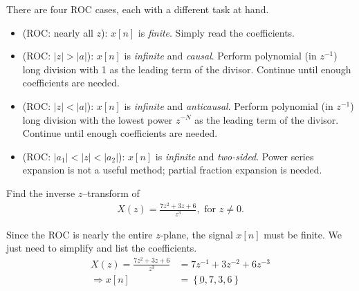 \documentclass{report}
\begin{document}
\begin{tcolorbox}[width=\textwidth,colback={white}, sharp corners]
    There are four ROC cases, each with a different task at hand.
    \begin{itemize}
        \item (ROC: nearly all $z$): $x[n]$ is \emph{finite}. Simply read the coefficients.
        \item (ROC: $|z|>|a|$): $x[n]$ is \emph{infinite} and \emph{causal}. Perform polynomial (in $z^{-1}$) long division with 1 as the leading term of the divisor. Continue until enough coefficients are needed.
        \item (ROC: $|z|<|a|$): $x[n]$ is \emph{infinite} and \emph{anticausal}. Perform polynomial (in $z^{-1}$) long division with the lowest power $z^{-N}$ as the leading term of the divisor. Continue until enough coefficients are needed.
        \item (ROC: $|a_1|<|z|<|a_2|$): $x[n]$ is \emph{infinite} and \emph{two-sided}. Power series expansion is not a useful method; partial fraction expansion is needed.
    \end{itemize}
\end{tcolorbox}

\begin{example}
    Find the inverse $z$--transform of 
    \begin{align*}
        X(z) = \frac{7z^2+3z+6}{z^3}, \text{ for } z\neq 0.
    \end{align*}
\end{example}
\begin{solution}
    Since the ROC is nearly the entire $z$-plane, the signal $x[n]$ must be finite. We just need to simplify and list the coefficients.
    \begin{align*}
        X(z) = \frac{7z^2+3z+6}{z^3} &= 7z^{-1} + 3z^{-2} + 6z^{-3} \\
        \Longrightarrow x[n] &= \left\{\underbar{0},7,3,6\right\} 
    \end{align*}
\end{solution}
\end{document}
